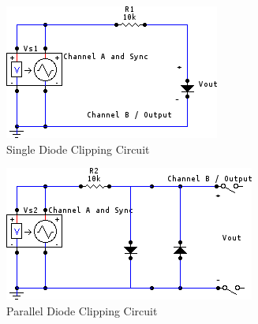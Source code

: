 \documentclass[twocolumn,english]{IEEEtran}
\begin{document}
  \begin{figure}[htpb]
  \begin{centering}
  \begin{center}
  \includegraphics[width=\linewidth]{./1.png}
  \caption{Single Diode Clipping Circuit}
  \label{fig:circuit_1a}
  \end{center}
  \par\end{centering}
  \end{figure}

  \begin{figure}[htpb]
  \begin{centering}
  \begin{center}
  \includegraphics[width=\linewidth]{./2.png}
  \caption{Parallel Diode Clipping Circuit}
  \label{fig:circuit_1b}
  \end{center}
  \par\end{centering}
  \end{figure}
\end{document}
